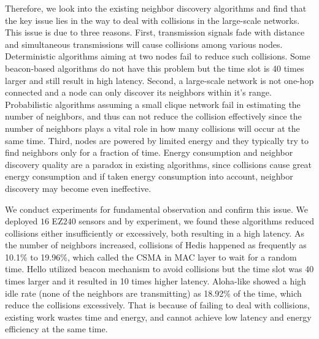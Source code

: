 Therefore, we look into the existing neighbor discovery algorithms and find that the key issue lies in the way to deal with collisions in the large-scale networks. %
This issue is due to three reasons.
First, transmission signals fade with distance and simultaneous transmissions will cause collisions among various nodes. Deterministic algorithms aiming at two nodes \cite{kandhalu2010u, chen2015heterogeneous} fail to reduce such collisions. Some beacon-based algorithms \cite{dutta2008practical, bakht2012searchlight, sun2014hello} do not have this problem but the time slot is 40 times larger and still result in high latency. 
Second, a large-scale network is not one-hop connected and a node can only discover its neighbors within it's range. Probabilistic algorithms \cite{vasudevan2009neighbor, you2011aloha, song2014probabilistic} assuming a small clique network fail in estimating the number of neighbors, and thus can not reduce the collision effectively since the number of neighbors plays a vital role in how many collisions will occur at the same time. 
Third, nodes are powered by limited energy and they typically try to find neighbors only for a fraction of time. Energy consumption and neighbor discovery quality are a paradox in existing algorithms, since collisions cause great energy consumption and if taken energy consumption into account, neighbor discovery may become even ineffective.

We conduct experiments for fundamental observation and confirm this issue. We deployed $16$ EZ$240$ sensors and 
by experiment, we found these algorithms reduced collisions either insufficiently or excessively, both resulting in a high latency.
As the number of neighbors increased, collisions of Hedis \cite{chen2015heterogeneous} happened as frequently as 10.1\% to 19.96\%, which called the CSMA \cite{bianchi1996performance} in MAC layer to wait for a random time. Hello \cite{sun2014hello} utilized beacon mechanism to avoid collisions but the time slot was 40 times larger and it resulted in 10 times higher latency.  Aloha-like \cite{you2011aloha} showed a high idle rate (none of the neighbors are transmitting) as 18.92\% of the time, which reduce the collisions excessively.  %
That is because of failing to deal with collisions, existing work wastes time and energy, and cannot achieve low latency and energy efficiency at the same time.

